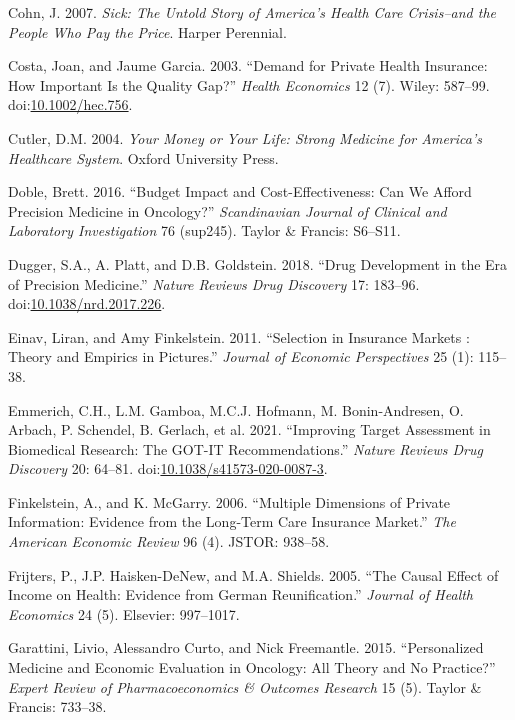 \documentclass[a4paper,12pt]{article}
\begin{document}
\hypertarget{citeproc_bib_item_7}{Cohn, J. 2007. \textit{Sick: The Untold Story of America’s Health Care Crisis–and the People Who Pay the Price}. Harper Perennial.}

\hypertarget{citeproc_bib_item_8}{Costa, Joan, and Jaume Garcia. 2003. “Demand for Private Health Insurance: How Important Is the Quality Gap?” \textit{Health Economics} 12 (7). Wiley: 587–99. doi:\href{https://doi.org/10.1002/hec.756}{10.1002/hec.756}.}

\hypertarget{citeproc_bib_item_9}{Cutler, D.M. 2004. \textit{Your Money or Your Life: Strong Medicine for America’s Healthcare System}. Oxford University Press.}

\hypertarget{citeproc_bib_item_10}{Doble, Brett. 2016. “Budget Impact and Cost-Effectiveness: Can We Afford Precision Medicine in Oncology?” \textit{Scandinavian Journal of Clinical and Laboratory Investigation} 76 (sup245). Taylor \& Francis: S6–S11.}

\hypertarget{citeproc_bib_item_11}{Dugger, S.A., A. Platt, and D.B. Goldstein. 2018. “Drug Development in the Era of Precision Medicine.” \textit{Nature Reviews Drug Discovery} 17: 183–96. doi:\href{https://doi.org/10.1038/nrd.2017.226}{10.1038/nrd.2017.226}.}

\hypertarget{citeproc_bib_item_12}{Einav, Liran, and Amy Finkelstein. 2011. “Selection in Insurance Markets : Theory and Empirics in Pictures.” \textit{Journal of Economic Perspectives} 25 (1): 115–38.}

\hypertarget{citeproc_bib_item_13}{Emmerich, C.H., L.M. Gamboa, M.C.J. Hofmann, M. Bonin-Andresen, O. Arbach, P. Schendel, B. Gerlach, et al. 2021. “Improving Target Assessment in Biomedical Research: The GOT-IT Recommendations.” \textit{Nature Reviews Drug Discovery} 20: 64–81. doi:\href{https://doi.org/10.1038/s41573-020-0087-3}{10.1038/s41573-020-0087-3}.}

\hypertarget{citeproc_bib_item_14}{Finkelstein, A., and K. McGarry. 2006. “Multiple Dimensions of Private Information: Evidence from the Long-Term Care Insurance Market.” \textit{The American Economic Review} 96 (4). JSTOR: 938–58.}

\hypertarget{citeproc_bib_item_15}{Frijters, P., J.P. Haisken-DeNew, and M.A. Shields. 2005. “The Causal Effect of Income on Health: Evidence from German Reunification.” \textit{Journal of Health Economics} 24 (5). Elsevier: 997–1017.}

\hypertarget{citeproc_bib_item_16}{Garattini, Livio, Alessandro Curto, and Nick Freemantle. 2015. “Personalized Medicine and Economic Evaluation in Oncology: All Theory and No Practice?” \textit{Expert Review of Pharmacoeconomics \& Outcomes Research} 15 (5). Taylor \& Francis: 733–38.}
\end{document}
